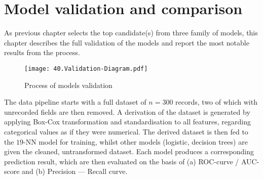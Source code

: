 
\section{Model validation and comparison}

As previous chapter selects the top candidate(s) from three family of models, this chapter describes the full validation of the models and report the most notable results from the process.

\begin{figure}[h]
    \centering
    \texttt{[image: 40.Validation-Diagram.pdf]}
    
    \caption{\centering Process of models validation}
\end{figure}

The data pipeline starts with a full dataset of \( n = 300 \) records, two of which with unrecorded fields are then removed. A derivation of the dataset is generated by applying Box-Cox transformation and standardisation to all features, regarding categorical values as if they were numerical. The derived dataset is then fed to the \( 19 \)-NN model for training, whilst other models (logistic, decision trees) are given the cleaned, untransformed dataset. Each model produces a corresponding prediction result, which are then evaluated on the basis of (a) ROC-curve / AUC-score and (b) Precision — Recall curve.



